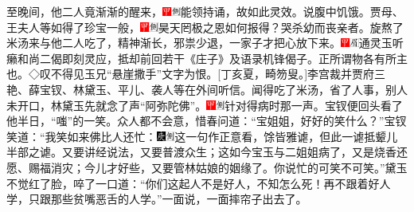 至晚间，他二人竟渐渐的醒来，{\includegraphics[width=3mm]{../Images/00002}\includegraphics[width=3mm]{../Images/00011}\footnotesize \kaishu 能领持诵，故如此灵效。}说腹中饥饿。贾母、王夫人等如得了珍宝一般，{\includegraphics[width=3mm]{../Images/00002}\includegraphics[width=3mm]{../Images/00011}\footnotesize \kaishu 昊天罔极之恩如何报得？哭杀幼而丧亲者。}旋熬了米汤来与他二人吃了，精神渐长，邪祟少退，一家子才把心放下来。{\includegraphics[width=3mm]{../Images/00002}\includegraphics[width=3mm]{../Images/00010}\footnotesize \kaishu 通灵玉听癞和尚二偈即刻灵应，抵却前回若干《庄子》及语录机锋偈子。正所谓物各有所主也。◇叹不得见玉兄``悬崖撒手''文字为恨。{[}丁亥夏，畸笏叟。{]}}李宫裁并贾府三艳、薛宝钗、林黛玉、平儿、袭人等在外间听信。闻得吃了米汤，省了人事，别人未开口，林黛玉先就念了声``阿弥陀佛''。{\includegraphics[width=3mm]{../Images/00002}\includegraphics[width=3mm]{../Images/00011}\footnotesize \kaishu 针对得病时那一声。}宝钗便回头看了他半日，``嗤''的一笑。众人都不会意，惜春问道：``宝姐姐，好好的笑什么？''宝钗笑道：``我笑如来佛比人还忙：{\includegraphics[width=3mm]{../Images/00004}\includegraphics[width=3mm]{../Images/00011}\footnotesize \kaishu 这一句作正意看，馀皆雅谑，但此一谑抵颦儿半部之谑。}又要讲经说法，又要普渡众生；这如今宝玉与二姐姐病了，又是烧香还愿、赐福消灾；今儿才好些，又要管林姑娘的姻缘了。你说忙的可笑不可笑。''黛玉不觉红了脸，啐了一口道：``你们这起人不是好人，不知怎么死！再不跟着好人学，只跟那些贫嘴恶舌的人学。''一面说，一面摔帘子出去了。

